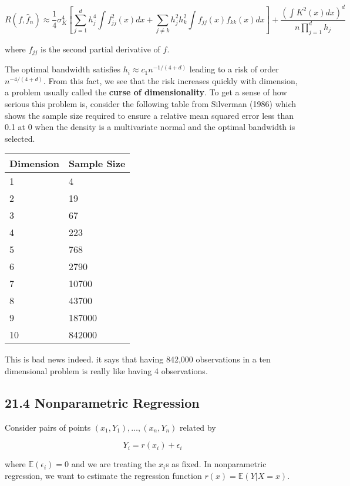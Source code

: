 \[
R(f, \hat{f}_{n}) 
\approx \frac{1}{4} \sigma_K^{4} \left[ \sum_{j=1}^{d} h_{j}^{4} \int f_{jj}^{2}(x) dx + \sum_{j \neq k} h_{j}^{2} h_{k}^{2} \int f_{jj}(x) f_{kk}(x) dx \right] + \frac{\left( \int K^{2}(x) dx\right)^{d}}{n \prod_{j=1}^{d} h_{j}}
\]

where \(f_{jj}\) is the second partial derivative of \(f\).

The optimal bandwidth satisfies \(h_{i} \approx c_{1} n^{-1/(4 + d)}\)
leading to a risk of order \(n^{-4/(4+d)}\). From this fact, we see that
the risk increases quickly with dimension, a problem usually called the
\textbf{curse of dimensionality}. To get a sense of how serious this
problem is, consider the following table from Silverman (1986) which
shows the sample size required to ensure a relative mean squared error
less than 0.1 at 0 when the density is a multivariate normal and the
optimal bandwidth is selected.

\begin{tabular}{@{}ll@{}}
\toprule
Dimension & Sample Size \\
\midrule
1 & 4 \\
2 & 19 \\
3 & 67 \\
4 & 223 \\
5 & 768 \\
6 & 2790 \\
7 & 10700 \\
8 & 43700 \\
9 & 187000 \\
10 & 842000 \\
\bottomrule
\end{tabular}

This is bad news indeed. it says that having 842,000 observations in a
ten dimensional problem is really like having 4 observations.

\subsection*{21.4 Nonparametric Regression}\label{nonparametric-regression}

Consider pairs of points \((x_{1}, Y_{1}), \dots, (x_{n}, Y_{n})\) related by

\[ Y_{i} = r(x_{i}) + \epsilon_{i} \]

where \(\mathbb{E}(\epsilon_{i}) = 0\) and we are treating the \(x_{i}\)s
as fixed. In nonparametric regression, we want to estimate the
regression function \(r(x) = \mathbb{E}(Y | X = x)\).

